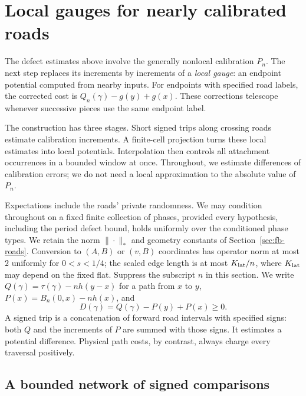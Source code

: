 \section{Local gauges for nearly calibrated roads}
\label{found:sec-gauges}

The defect estimates above involve the generally nonlocal calibration
$P_n$.  The next step replaces its increments by increments of a
\emph{local gauge}: an endpoint potential computed from nearby inputs.
For endpoints with specified road labels, the corrected cost is
$Q_n(\gamma)-g(y)+g(x)$.  These corrections telescope whenever
successive pieces use the same endpoint label.

The construction has three stages.  Short signed trips along crossing
roads estimate calibration increments.  A finite-cell projection turns
these local estimates into local potentials.  Interpolation then
controls all attachment occurrences in a bounded window at once.
Throughout, we estimate differences of calibration errors; we do not
need a local approximation to the absolute value of $P_n$.

Expectations include the roads' private randomness.  We may condition
throughout on a fixed finite collection of phases, provided every
hypothesis, including the period defect bound, holds uniformly over
the conditioned phase types.
We retain the norm $\|\cdot\|_*$ and geometry constants of
Section~\ref{sec:fb-roads}. Conversion to $(A,B)$ or $(v,B)$ coordinates
has operator norm at most $2$ uniformly for $0<s<1/4$; the scaled
edge length is at most $K_{\rm lat}/n$, where $K_{\rm lat}$ may depend
on the fixed flat. Suppress the subscript $n$ in this section.
We write $Q(\gamma)=\tau(\gamma)-nh(y-x)$ for a path from $x$ to $y$,
$P(x)=B_n(0,x)-nh(x)$, and
\[
 D(\gamma)=Q(\gamma)-P(y)+P(x)\geq0.
\]
A signed trip is a concatenation of forward road intervals with
specified signs: both $Q$ and the increments of $P$ are summed with
those signs.  It estimates a potential difference.  Physical path
costs, by contrast, always charge every traversal positively.

\subsection{A bounded network of signed comparisons}

